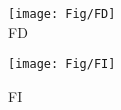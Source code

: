 \begin{figure}
\centering
\begin{minipage}[t]{0.5\linewidth}
\centering
\texttt{[image: Fig/FD]}\\
\caption{ FD}\label{fig:FD}
\end{minipage}
\hfill
\begin{minipage}[t]{0.5\linewidth}
\centering
\texttt{[image: Fig/FI]}\\
\caption{FI}\label{fig:FI}
\end{minipage}
\end{figure}




